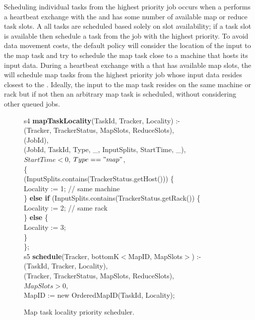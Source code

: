 Scheduling individual tasks from the highest priority job occurs when a \TT
performs a heartbeat exchange with the \JT and has some number of available map
or reduce task slots.  A all tasks are scheduled based solely on slot
availability; if a task slot is available then schedule a task from the job
with the highest priority.  To avoid data movement costs, the default policy
will consider the location of the input to the map task and try to schedule the
map task close to a machine that hosts its input data.  During a heartbeat
exchange with a \TT that has available map slots, the \JT will schedule map
tasks from the highest priority job whose input data resides closest to the
\TT.  Ideally, the input to the map task resides on the same machine or rack
but if not then an arbitrary map task is scheduled, without considering other
queued jobs.

\begin{figure}
\ssp
\centering
\begin{boxedminipage}{\linewidth}
s4 {\bf mapTaskLocality}(TaskId, Tracker, Locality) :- \\
(Tracker, TrackerStatus, MapSlots, ReduceSlots), \\
(JobId), \\
(JobId, TaskId, Type, \_, InputSplits, StartTime, \_), \\
\datalogspace $StartTime < 0$, $Type == "map"$, \\
\datalogspace \{ \\
\datalogspace {} (InputSplits.contains(TrackerStatus.getHost())) \{ \\
\datalogspace \datalogspace \datalogspace Locality := 1; // same machine \\
\datalogspace \datalogspace \} {\bf else if} (InputSplits.contains(TrackerStatus.getRack()) \{ \\
\datalogspace \datalogspace \datalogspace Locality := 2; // same rack \\
\datalogspace \datalogspace \} {\bf else} \{ \\
\datalogspace \datalogspace \datalogspace Locality := 3;  \\
\datalogspace \datalogspace \} \\
\datalogspace \}; \\
	
s5 {\bf schedule}(Tracker, bottomK$<$MapID, MapSlots$>$) :- \\
(TaskId, Tracker, Locality), \\
(Tracker, TrackerStatus, MapSlots, ReduceSlots), \\
\datalogspace $MapSlots > 0$, \\
\datalogspace MapID := new OrderedMapID(TaskId, Locality); \\

\end{boxedminipage}
\caption{\label{ch:boom:fig:schedule} Map task locality priority scheduler.}
\end{figure}


